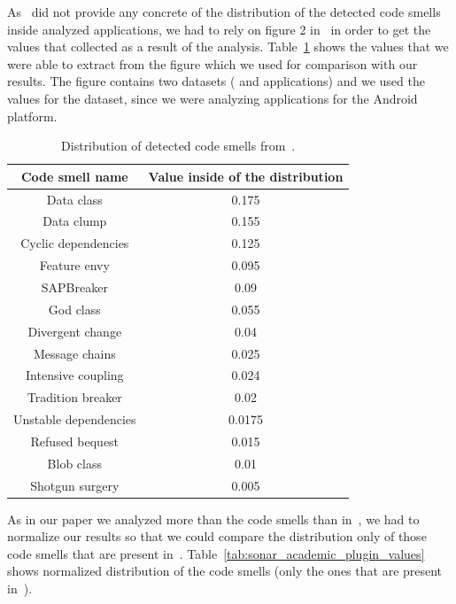 As~\citeauthor{mannan2016understanding} did not provide any concrete of the distribution of the detected
code smells inside analyzed applications, we had to rely on figure 2 in~\cite{mannan2016understanding} in order
to get the values that collected as a result of the analysis.
Table~\ref{tab:understading_andoid_smells_values} shows the values that we were able to extract from the figure which we used for comparison
with our results.
The figure contains two datasets ( and  applications) and we used the values for the 
dataset, since we were analyzing applications for the Android platform.

\begin{table}
    \begin{center}
        \begin{tabular} {| c | c |}
            \hline
            \textbf{Code smell name} & \textbf{Value inside of the distribution} \\ \hline
            Data class & 0.175 \\ \hline
            Data clump & 0.155 \\ \hline
            Cyclic dependencies & 0.125 \\ \hline
            Feature envy & 0.095 \\ \hline
            SAPBreaker & 0.09 \\ \hline
            God class & 0.055 \\ \hline
            Divergent change & 0.04 \\ \hline
            Message chains & 0.025 \\ \hline
            Intensive coupling & 0.024 \\ \hline
            Tradition breaker & 0.02 \\ \hline
            Unstable dependencies & 0.0175 \\ \hline
            Refused bequest & 0.015 \\ \hline
            Blob class & 0.01 \\ \hline
            Shotgun surgery & 0.005 \\ \hline
        \end{tabular}
        \caption{Distribution of detected code smells from~\cite{mannan2016understanding}.}
        \label{tab:understading_andoid_smells_values}
    \end{center}
\end{table}

As in our paper we analyzed more than the code smells than in~\cite{mannan2016understanding}, we had to normalize
our results so that we could compare the distribution only of those code smells that are present in~\cite{mannan2016understanding}.
Table~\ref{tab:sonar_academic_plugin_values} shows normalized distribution of the code smells (only the ones that
are present in~\cite{mannan2016understanding}).

